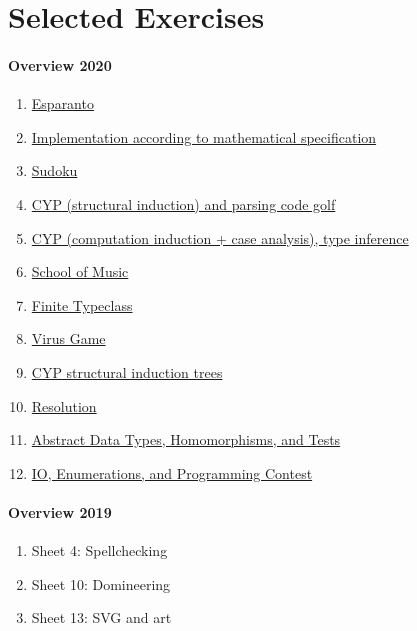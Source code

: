 \section{Selected Exercises}

\paragraph{Overview 2020}
\begin{enumerate}
\item \href{https://www21.in.tum.de/teaching/fpv/WS20/assets/ex01.pdf}{Esparanto}
\item \href{https://www21.in.tum.de/teaching/fpv/WS20/assets/ex02.pdf}{Implementation according to mathematical specification}
\item \href{https://www21.in.tum.de/teaching/fpv/WS20/assets/ex03.pdf}{Sudoku}
\item \href{https://www21.in.tum.de/teaching/fpv/WS20/assets/ex04.pdf}{CYP (structural induction) and parsing code golf}
\item \href{https://www21.in.tum.de/teaching/fpv/WS20/assets/ex05.pdf}{CYP (computation induction + case analysis), type inference}
\item \href{https://www21.in.tum.de/teaching/fpv/WS20/assets/ex06.pdf}{School of Music}
\item \href{https://www21.in.tum.de/teaching/fpv/WS20/assets/ex07.pdf}{Finite Typeclass}
\item \href{https://www21.in.tum.de/teaching/fpv/WS20/assets/ex08.pdf}{Virus Game}
\item \href{https://www21.in.tum.de/teaching/fpv/WS20/assets/ex09.pdf}{CYP structural induction trees}
\item \href{https://www21.in.tum.de/teaching/fpv/WS20/assets/ex10.pdf}{Resolution}
\item \href{https://www21.in.tum.de/teaching/fpv/WS20/assets/ex11.pdf}{Abstract Data Types, Homomorphisms, and Tests}
\item \href{https://www21.in.tum.de/teaching/fpv/WS20/assets/ex12.pdf}{IO, Enumerations, and Programming Contest}
\end{enumerate}

\paragraph{Overview 2019}
\begin{enumerate}
\item Sheet 4: Spellchecking
\item Sheet 10: Domineering
\item Sheet 13: SVG and art
\end{enumerate}
